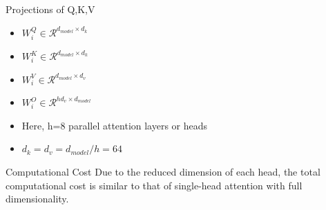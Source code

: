 \documentclass{beamer}
\begin{document}
\begin{frame}[fragile]{Projections of Q,K,V}
	\begin{itemize}
		\item $W_{i}^{Q} \in \mathcal{R}^{d_{model} \times d_{k}}$
		\item $W_{i}^{K} \in \mathcal{R}^{d_{model} \times d_{k}}$
		\item $W_{i}^{V} \in \mathcal{R}^{d_{model} \times d_{v}}$
		\item $W_{i}^{O} \in \mathcal{R}^{hd_{v} \times d_{model}}$
		\item Here, h=8 parallel attention layers or heads
		\item $d_k = d_v = d_{model}/h = 64$
	\end{itemize}
	
	\begin{block}{Computational Cost}
		Due to the reduced dimension of each head, the total computational cost is similar to that of single-head attention with full dimensionality.
	\end{block}
\end{frame}
\end{document}
